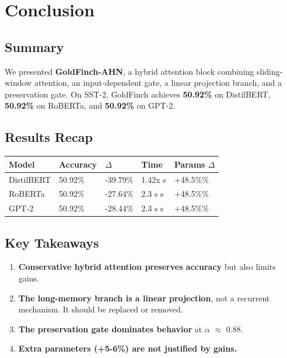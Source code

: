 
\section{Conclusion}

\subsection{Summary}

We presented \textbf{GoldFinch-AHN}, a hybrid attention block combining 
sliding-window attention, an input-dependent gate, a linear projection 
branch, and a preservation gate. On SST-2, GoldFinch achieves 
\textbf{50.92\%} on DistilBERT, \textbf{50.92\%} on RoBERTa, and 
\textbf{50.92\%} on GPT-2.

\subsection{Results Recap}

\begin{table}[H]
\centering
\small
\begin{tabular}{lllll}
\toprule
\textbf{Model} & \textbf{Accuracy} & \textbf{$\Delta$} & \textbf{Time} & \textbf{Params $\Delta$} \\
\midrule
DistilBERT & 50.92\% & -39.79\% & 1.42x s & +48.5\%\% \\
RoBERTa & 50.92\% & -27.64\% & 2.3 s s & +48.5\%\% \\
GPT-2 & 50.92\% & -28.44\% & 2.3 s s & +48.5\%\% \\
\bottomrule
\end{tabular}
\end{table}

\subsection{Key Takeaways}

\begin{enumerate}
\item \textbf{Conservative hybrid attention preserves accuracy} but also limits
  gains.
\item \textbf{The long-memory branch is a linear projection}, not a recurrent
  mechanism. It should be replaced or removed.
\item \textbf{The preservation gate dominates behavior} at $\alpha$ $\approx$ 0.88.
\item \textbf{Extra parameters (+5-6\%) are not justified by gains.}

\end{enumerate}
